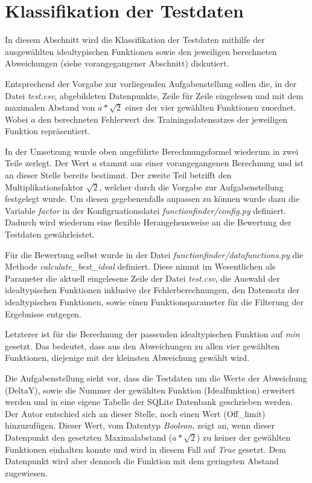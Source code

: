 \section{Klassifikation der Testdaten}

In diesem Abschnitt wird die Klassifikation der Testdaten mithilfe der ausgewählten idealtypischen Funktionen sowie den jeweiligen berechneten Abweichungen (siehe vorangegangener Abschnitt) diskutiert.

Entsprechend der Vorgabe zur vorliegenden Aufgabenstellung sollen die, in der Datei \emph{test.csv}, abgebildeten Datenpunkte, Zeile für Zeile eingelesen und mit dem maximalen Abstand von $ a*\sqrt{2}$ einer der vier gewählten Funktionen zuordnet. Wobei $a$ den berechneten Fehlerwert des Trainingsdatensatzes der jeweiligen Funktion repräsentiert.

In der Umsetzung wurde oben angeführte Berechnungsformel wiederum in zwei Teile zerlegt. Der Wert $a$ stammt aus einer vorangegangenen Berechnung und ist an dieser Stelle bereits bestimmt. Der zweite Teil betrifft den Multiplikationsfaktor $\sqrt{2}$, welcher durch die Vorgabe zur Aufgabenstellung festgelegt wurde. Um diesen gegebenenfalls anpassen zu können wurde dazu die Variable \emph{factor} in der Konfigruationsdatei \emph{functionfinder/config.py} definiert. Dadurch wird wiederum eine flexible Herangehensweise an die Bewertung der Testdaten gewährleistet.

Für die Bewertung selbst wurde in der Datei \emph{functionfinder/datafunctions.py} die Methode \emph{calculate\_best\_ideal} definiert. Diese nimmt im Wesentlichen als Parameter die aktuell eingelesene Zeile der Datei \emph{test.csv}, die Auswahl der idealtypischen Funktionen inklusive der Fehlerberechnungen, den Datensatz der idealtypischen Funktionen, sowie einen Funktionsparameter für die Filterung der Ergebnisse entgegen. 

Letzterer ist für die Berechnung der passenden idealtypischen Funktion auf \emph{min} gesetzt. Das bedeutet, dass aus den Abweichungen zu allen vier gewählten Funktionen, diejenige mit der kleinsten Abweichung gewählt wird.

Die Aufgabenstellung sieht vor, dass die Testdaten um die Werte der Abweichung (DeltaY), sowie die Nummer der gewählten Funktion (Idealfunktion) erweitert werden und in eine eigene Tabelle der SQLite Datenbank geschrieben werden. Der Autor entschied sich an dieser Stelle, noch einen Wert (Off\_limit) hinzuzufügen. Dieser Wert, vom Datentyp \emph{Boolean}, zeigt an, wenn dieser Datenpunkt den gesetzten Maximalabstand ($a*\sqrt{2}$) zu keiner der gewählten Funktionen einhalten konnte und wird in diesem Fall auf \emph{True} gesetzt. Dem Datenpunkt wird aber dennoch die Funktion mit dem geringsten Abstand zugewiesen.

